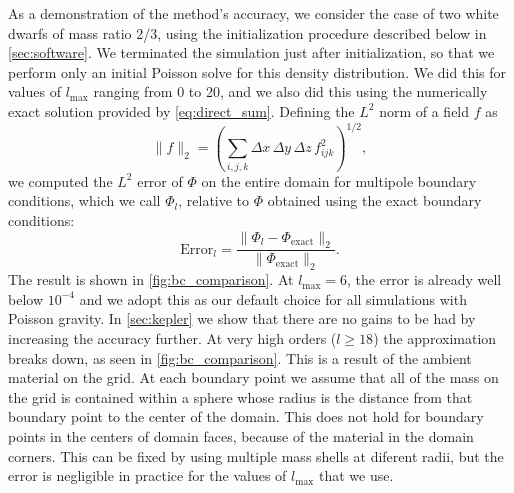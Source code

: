 \documentclass[12pt]{article}
\begin{document}
As a demonstration of the method's accuracy, we consider the case of two 
white dwarfs of mass ratio 2/3, using the initialization procedure described below 
in \autoref{sec:software}. We terminated the simulation just after
initialization, so that we perform only an initial Poisson solve for this 
density distribution. We did this for values of $l_{\text{max}}$ ranging
from 0 to 20, and we also did this using the numerically exact solution 
provided by \autoref{eq:direct_sum}.  Defining the $L^2$
norm of a field $f$ as
\begin{equation}
  \| f \|_2 = \left(\sum_{i,j,k} \Delta x\, \Delta y\, \Delta z\, f_{ijk}^2\right)^{1/2},
\end{equation}
we computed the $L^2$ error of $\Phi$ on the entire domain for multipole 
boundary conditions, which we call $\Phi_l$, relative to $\Phi$ 
obtained using the exact boundary conditions:
\begin{equation}
  \text{Error}_l = \frac{\|\Phi_l - \Phi_{\text{exact}}\|_2}{\|\Phi_{\text{exact}}\|_2}.
\end{equation}
The result is shown in \autoref{fig:bc_comparison}. At $l_{\text{max}} = 6$,
the error is already well below $10^{-4}$ and we adopt this as our default 
choice for all simulations with Poisson gravity. In \autoref{sec:kepler} we 
show that there are no gains to be had by increasing the accuracy further. At 
very high orders ($l \ge 18$) the approximation breaks down, as seen in \autoref{fig:bc_comparison}. 
This is a result of the ambient material on the grid. At each boundary point we 
assume that all of the mass on the grid is contained within a sphere whose radius is 
the distance from that boundary point to the center of the domain. This does not hold 
for boundary points in the centers of domain faces, because of the material in the 
domain corners. This can be fixed by using multiple mass shells at diferent radii, but the error 
is negligible in practice for the values of $l_{\text{max}}$ that we use.
\end{document}
